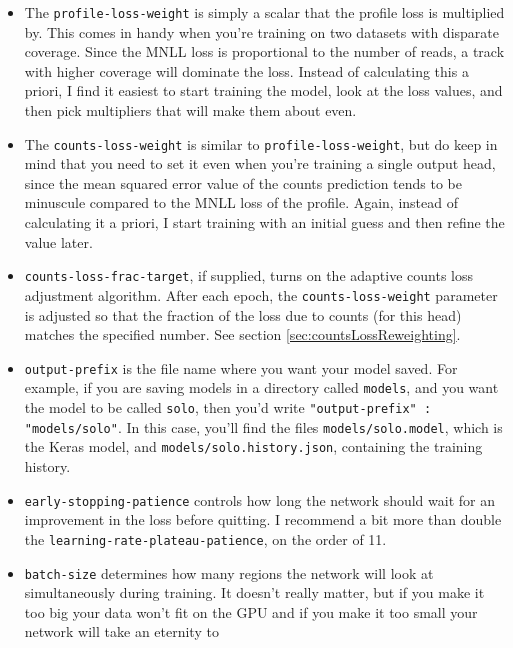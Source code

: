 \documentclass{article}
\begin{document}
\begin{itemize}
    \item The \texttt{profile-loss-weight} is simply a scalar that the profile loss is multiplied
        by. This comes in handy when you're training on two datasets with disparate coverage.
        Since the MNLL loss is proportional to the number of reads, a track with higher
        coverage will dominate the loss. Instead of calculating this a priori, I find it
        easiest to start training the model, look at the loss values, and then pick
        multipliers that will make them about even.
    \item The \texttt{counts-loss-weight} is similar to \texttt{profile-loss-weight}, but do keep
        in mind that you need to set it even when you're training a single output head, since
        the mean squared error value of the counts prediction tends to be minuscule compared
        to the MNLL loss of the profile. Again, instead of calculating it a priori, I start
        training with an initial guess and then refine the value later.
    \item \texttt{counts-loss-frac-target}, if supplied, turns on the adaptive counts loss
        adjustment algorithm. After each epoch, the \texttt{counts-loss-weight} parameter
        is adjusted so that the fraction of the loss due to counts (for this head)
        matches the specified number. See section \ref{sec:countsLossReweighting}.
    \item \texttt{output-prefix} is the file name where you want your model saved.
        For example, if you are saving models in a directory called \texttt{models}, and you
        want the model to be called \texttt{solo}, then you'd write
        \texttt{"output-prefix" : "models/solo"}. In this case, you'll find the files
        \texttt{models/solo.model}, which is the Keras model, and
        \texttt{models/solo.history.json}, containing the training history.
    \item \texttt{early-stopping-patience} controls how long the network should wait for an
        improvement in the loss before quitting. I recommend a bit more than double the
        \texttt{learning-rate-plateau-patience}, on the order of 11.
    \item \texttt{batch-size} determines how many regions the network will look at simultaneously
        during training. It doesn't really matter, but if you make it too big your data won't
        fit on the GPU and if you make it too small your network will take an eternity to

\end{itemize}
\end{document}
